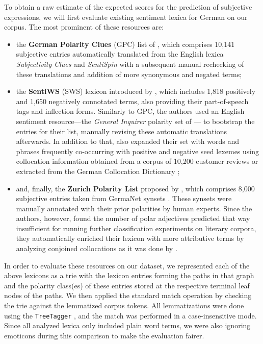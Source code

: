 To obtain a raw estimate of the expected scores for the prediction of
subjective expressions, we will first evaluate existing sentiment
lexica for German on our corpus.  The most prominent of these
resources are:
\begin{itemize}
\item the \textbf{German Polarity Clues} (GPC) list of
  \citet{Waltinger:10}, which comprises 10,141 subjective entries
  automatically translated from the English lexica \emph{Subjectivity
    Clues} \cite{Wilson:05} and \emph{SentiSpin} \cite{Takamura:05}
  with a subsequent manual rechecking of these translations and
  addition of more synonymous and negated terms;

\item the \textbf{SentiWS} (SWS) lexicon introduced by
  \citet{Remus:10}, which includes 1,818 positively and 1,650
  negatively connotated terms, also providing their part-of-speech
  tags and inflection forms.  Similarly to GPC, the authors used an
  English sentiment resource---the \emph{General Inquirer} polarity
  set of \citet{Stone:66}--- to bootstrap the entries for their list,
  manually revising these automatic translations afterwards.  In
  addition to that, \citet{Remus:10} also expanded their set with
  words and phrases frequently co-occurring with positive and negative
  seed lexemes using collocation information obtained from a corpus of
  10,200 customer reviews or extracted from the German Collocation
  Dictionary \cite{Quasthoff:10};

\item and, finally, the \textbf{Zurich Polarity List} proposed by
  \citet{Clematide:10}, which comprises 8,000 subjective entries taken
  from GermaNet synsets \cite{Hamp:97}.  These synsets were manually
  annotated with their prior polarities by human experts.  Since the
  authors, however, found the number of polar adjectives predicted
  that way insufficient for running further classification experiments
  on literary corpora, they automatically enriched their lexicon with
  more attributive terms by analyzing conjoined collocations as it was
  done by \citet{Hatzivassi:97}.
\end{itemize}

In order to evaluate these resources on our dataset, we represented
each of the above lexicons as a trie \cite{Knuth:73} with the lexicon
entries forming the paths in that graph and the polarity class(es) of
these entries stored at the respective terminal leaf nodes of the
paths.  We then applied the standard match operation by checking the
trie against the lemmatized corpus tokens.  All lemmatizations were
done using the \texttt{TreeTagger} \cite{Schmid:95}, and the match was
performed in a case-insensitive mode.  Since all analyzed lexica only
included plain word terms, we were also ignoring emoticons during this
comparison to make the evaluation fairer.

